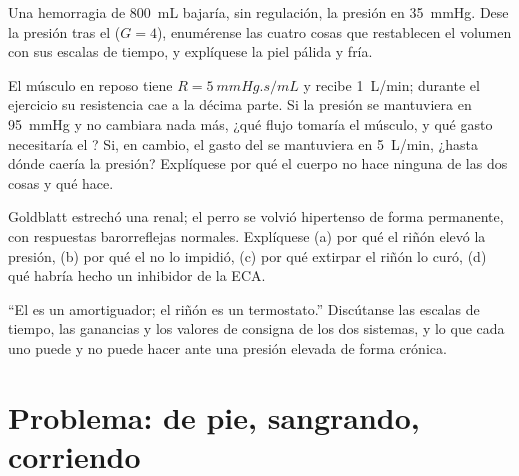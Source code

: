 \begin{exercise}[$\star\star$]\label{exo:b2:blood-pressure:9}
Una hemorragia de \qty{800}{mL} bajaría, sin regulación, la presión en
\qty{35}{mmHg}. Dese la presión tras el  ($G = 4$), enumérense
las cuatro cosas que restablecen el volumen con sus escalas de tiempo, y
explíquese la piel pálida y fría.
\end{exercise}

\begin{exercise}[$\star\star\star$]\label{exo:b2:blood-pressure:10}
El músculo en reposo tiene $R = \qty{5}{mmHg.s/mL}$ y recibe
\qty{1}{L/min}; durante el ejercicio su resistencia cae a la décima parte.
Si la presión se mantuviera en \qty{95}{mmHg} y no cambiara nada más, ¿qué
flujo tomaría el músculo, y qué gasto necesitaría el ? Si, en
cambio, el gasto del  se mantuviera en \qty{5}{L/min}, ¿hasta dónde
caería la presión? Explíquese por qué el cuerpo no hace ninguna de las dos
cosas y qué hace.
\end{exercise}

\begin{exercise}[$\star\star\star$]\label{exo:b2:blood-pressure:11}
Goldblatt estrechó una  renal; el perro se volvió hipertenso de
forma permanente, con respuestas barorreflejas normales. Explíquese (a) por
qué el riñón elevó la presión, (b) por qué el  no lo impidió,
(c) por qué extirpar el riñón lo curó, (d) qué habría hecho un inhibidor de
la ECA.
\end{exercise}

\begin{exercise}[$\star\star\star$]\label{exo:b2:blood-pressure:12}
``El  es un amortiguador; el riñón es un termostato.''
Discútanse las escalas de tiempo, las ganancias y los valores de consigna
de los dos sistemas, y lo que cada uno puede y no puede hacer ante una
presión elevada de forma crónica.
\end{exercise}

\section{Problema: de pie, sangrando, corriendo}

